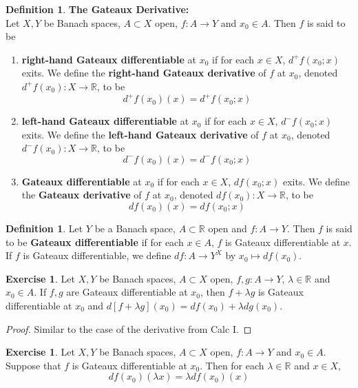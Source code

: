 \documentclass[12pt]{amsart}
\theoremstyle{definition}
\newtheorem{defn}[definition]{Definition}
\newtheorem{ex}[definition]{Exercise}
\newcommand{\lam}{\lambda}
\newcommand{\R}{\mathbb{R}}
\newcommand{\tbf}[1]{\textbf{#1}}
\DeclareMathOperator*{\0}{\mbf{0}}
\DeclareMathOperator*{\1}{\mbf{1}}
\newcommand{\lex}[1]{\label{ex:#1}}
\newcommand{\ld}[1]{\label{defn:#1}}
\begin{document}
	\begin{defn} \ld{}\tbf{The Gateaux Derivative:}\\
	Let $X,Y$ be Banach spaces, $A \subset X$ open, $f:A \rightarrow Y$ and $x_0 \in A$. Then $f$ is said to be 
	\begin{enumerate}
	\item \tbf{right-hand Gateaux differentiable} at $x_0$ if for each $x \in X$, $d^+ f(x_0; x)$ exits. We define the \tbf{right-hand Gateaux derivative} of $f$ at $x_0$, denoted $d^+ f(x_0) : X \rightarrow \R$, to be $$d^+ f(x_0)(x) = d^+ f(x_0;x)$$ 
	
	\item \tbf{left-hand Gateaux differentiable} at $x_0$ if for each $x \in X$, $d^- f(x_0; x)$ exits. We define the \tbf{left-hand Gateaux derivative} of $f$ at $x_0$, denoted $d^- f(x_0) : X \rightarrow \R$, to be $$d^- f(x_0)(x) = d^- f(x_0;x)$$
	
	\item \tbf{Gateaux differentiable} at $x_0$ if for each $x \in X$, $d f(x_0; x)$ exits. We define the \tbf{Gateaux derivative} of $f$ at $x_0$, denoted $d f(x_0) : X \rightarrow \R$, to be $$d f(x_0)(x) = d f(x_0;x)$$
	\end{enumerate}
	\end{defn}
	
	\begin{defn} \ld{61003}
Let $Y$ be a Banach space, $A \subset \R$ open and $f:A \rightarrow Y$. Then $f$ is said to be \tbf{Gateaux differentiable} if for each $x \in A$, $f$ is Gateaux differentiable at $x$. If $f$ is Gateaux differentiable, we define $df:A \rightarrow Y^X$ by $x_0 \mapsto df(x_0)$.
\end{defn}	
	
	\begin{ex} \lex{61004}
	Let $X, Y$ be Banach spaces, $A \subset X$ open, $f,g :A \rightarrow Y$, $\lam \in \R$ and $x_0 \in A$. If $f, g$ are Gateaux differentiable at $x_0$, then $f + \lam g$ is Gateaux differentiable at $x_0$ and $d[f+\lam g](x_0) = df(x_0) + \lam dg(x_0)$.
	\end{ex}
	
	\begin{proof}
	Similar to the case of the derivative from Calc I. 
	\end{proof}		
	
	\begin{ex} \lex{61005}
	Let $X, Y$ be Banach spaces, $A \subset X$ open, $f:A \rightarrow Y$ and $x_0 \in A$. Suppose that $f$ is Gateaux differentiable at $x_0$. Then for each $\lam \in \R$ and $x \in X$, $$df(x_0)(\lam x) = \lam df(x_0)(x)$$
	\end{ex}
	
\end{document}
